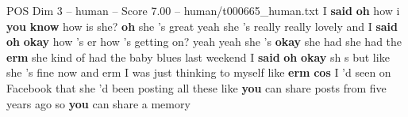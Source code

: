 \begin{textsample}{POS Dim 3 – human – Score 7.00 – human/t000665\_human.txt}  \label{ex:f3_pos_015}
I \textbf{said} \textbf{oh} how i \textbf{you} \textbf{know} how is she? \textbf{oh} she 's great yeah she 's really really lovely and I \textbf{said} \textbf{oh} \textbf{okay} how 's er how 's getting on? yeah yeah she 's \textbf{okay} she had she had the \textbf{erm} she kind of had the baby blues last weekend I \textbf{said} \textbf{oh} \textbf{okay} sh s but like she 's fine now and erm I was just thinking to myself like \textbf{erm} \textbf{cos} I 'd seen on Facebook that she 'd been posting all these like \textbf{you} can share posts from five years ago so \textbf{you} can share a memory

\end{textsample}
